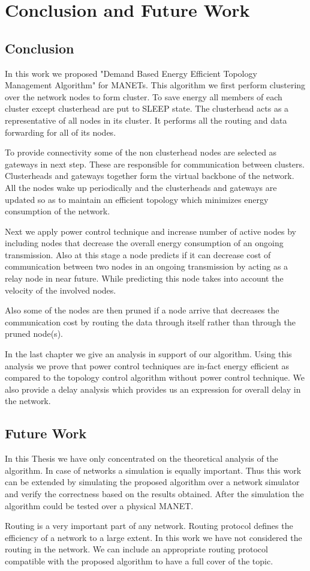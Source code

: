 \chapter{Conclusion and Future Work}
\section{Conclusion}
In this work we proposed "Demand Based Energy Efficient Topology Management Algorithm" for MANETs. This algorithm we first perform clustering over the network nodes to form cluster. To save energy all members of each cluster except clusterhead are put to SLEEP state. The clusterhead acts as a representative of all nodes in its cluster. It performs all the routing and data forwarding for all of its nodes.

To provide connectivity some of the non clusterhead nodes are selected as gateways in next step. These are responsible for communication between clusters. Clusterheads and gateways together form the virtual backbone of the network. All the nodes wake up periodically and the clusterheads and gateways are updated so as to maintain an efficient topology which minimizes energy consumption of the network.

Next we apply power control technique and increase number of active nodes by including nodes that decrease the overall energy consumption of an ongoing transmission. Also at this stage a node predicts if it can decrease cost of communication between two nodes in an ongoing transmission by acting as a relay node in near future. While predicting this node takes into account the velocity of the involved nodes.

Also some of the nodes are then pruned if a node arrive that decreases the communication cost by routing the data through itself rather than through the pruned node(s).

In the last chapter we give an analysis in support of our algorithm. Using this analysis we prove that power control techniques are in-fact energy efficient as compared to the topology control algorithm without power control technique.
We also provide a delay analysis which provides us an expression for overall delay in the network.\\

\section{Future Work}
%
In this Thesis we have only concentrated on the theoretical analysis of the algorithm. In case of networks a simulation is equally important. Thus this work can be extended by simulating the proposed algorithm over a network simulator and verify the correctness based on the results obtained. After the simulation the algorithm could be tested over a physical MANET.

Routing is a very important part of any network. Routing protocol defines the efficiency of a network to a large extent. In this work we have not considered the routing in the network. We can include an appropriate routing protocol compatible with the proposed algorithm to have a full cover of the topic.
